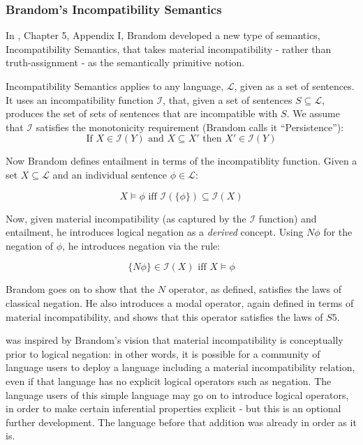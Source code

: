 \subsubsection{Brandom's Incompatibility Semantics}

\NI In \cite{brandom}, Chapter 5, Appendix I, Brandom developed a new
type of semantics, Incompatibility Semantics, that takes material
incompatibility - rather than truth-assignment - as the semantically
primitive notion.

Incompatibility Semantics applies to any language, $\mathcal{L}$,
given as a set of sentences.  It uses an incompatibility function
$\mathcal{I}$, that, given a set of sentences $S \subseteq
\mathcal{L}$, produces the set of sets of sentences that are
incompatible with $S$.  We assume that $\mathcal{I}$ satisfies the
monotonicity requirement (Brandom calls it ``Persistence''):
\[
   \text{If } X \in \mathcal{I}(Y) \text{ and } X \subseteq X' \text{ then } X' \in \mathcal{I}(Y)
\]

\NI Now Brandom defines entailment in terms of the incompatiblity
function. Given a set $X \subseteq \mathcal{L}$ and an individual
sentence $\phi \in \mathcal{L}$:

\[
   X \models \phi \text{ iff } \mathcal{I}(\{\phi\}) \subseteq \mathcal{I}(X)
\]

\NI Now, given material incompatibility (as captured by the
$\mathcal{I}$ function) and entailment, he introduces logical negation
as a \emph{derived} concept. Using $N \phi$ for the negation of
$\phi$, he introduces negation via the rule:

\[
   \{N \phi\} \in \mathcal{I}(X) \text{ iff } X \models \phi
\]

\NI Brandom goes on to show that the $N$ operator, as defined, satisfies
the laws of classical negation.  He also introduces a modal operator,
again defined in terms of material incompatibility, and shows that
this operator satisfies the laws of $S5$.

\ELFULL{} was inspired by Brandom's vision that material
incompatibility is conceptually prior to logical negation: in other
words, it is possible for a community of language users to deploy a
language including a material incompatibility relation, even if that
language has no explicit logical operators such as negation.  The
language users of this simple language may go on to introduce logical
operators, in order to make certain inferential properties explicit -
but this is an optional further development.  The language before that
addition was already in order as it is.

